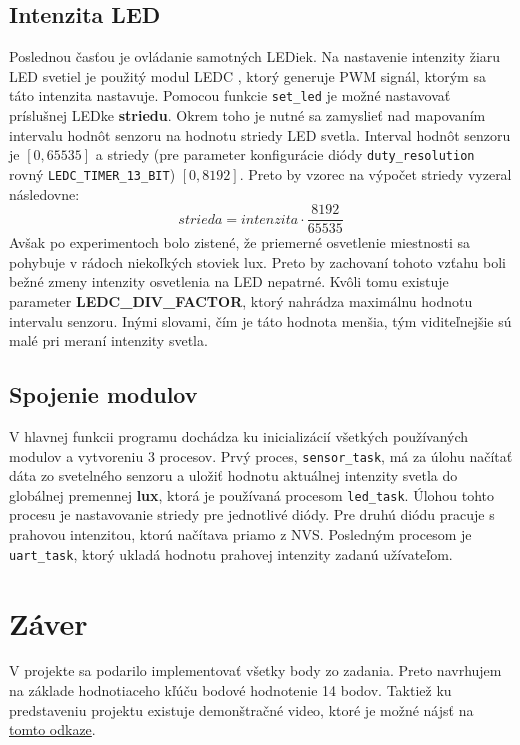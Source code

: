 \documentclass[a4paper]{article}
\begin{document}
\subsection{Intenzita LED}
Poslednou časťou je ovládanie samotných LEDiek. Na nastavenie intenzity žiaru LED svetiel je použitý modul LEDC \cite{LEDCdoc}, ktorý generuje PWM signál, ktorým sa táto intenzita nastavuje.
Pomocou funkcie \texttt{set\_led} je možné nastavovať príslušnej LEDke \textbf{striedu}. Okrem toho je nutné sa zamyslieť nad mapovaním intervalu hodnôt senzoru na hodnotu striedy LED svetla.
Interval hodnôt senzoru je $[0, 65535]$ a striedy (pre parameter konfigurácie diódy \texttt{duty\_resolution} rovný \texttt{LEDC\_TIMER\_13\_BIT}) $[0, 8192]$. Preto by vzorec na výpočet striedy vyzeral následovne:
\[strieda = intenzita \cdot \frac{8192}{65535}\]
Avšak po experimentoch bolo zistené, že priemerné osvetlenie miestnosti sa pohybuje v rádoch niekoľkých stoviek lux. Preto by zachovaní tohoto vzťahu boli bežné zmeny intenzity osvetlenia na LED nepatrné.
Kvôli tomu existuje parameter \textbf{LEDC\_DIV\_FACTOR}, ktorý nahrádza maximálnu hodnotu intervalu senzoru. Inými slovami, čím je táto hodnota menšia, tým viditeľnejšie sú malé pri meraní intenzity svetla.

\subsection{Spojenie modulov}
V hlavnej funkcii programu dochádza ku inicializácií všetkých používaných modulov a vytvoreniu 3 procesov. Prvý proces, \texttt{sensor\_task}, má za úlohu načítať dáta zo svetelného senzoru a uložiť hodnotu
aktuálnej intenzity svetla do globálnej premennej \textbf{lux}, ktorá je používaná procesom \texttt{led\_task}. Úlohou tohto procesu je nastavovanie striedy pre jednotlivé diódy. Pre druhú diódu pracuje
s prahovou intenzitou, ktorú načítava priamo z NVS. Posledným procesom je \texttt{uart\_task}, ktorý ukladá hodnotu prahovej intenzity zadanú užívateľom.

\section{Záver}
V projekte sa podarilo implementovať všetky body zo zadania. Preto navrhujem na základe hodnotiaceho kľúču bodové hodnotenie 14 bodov. Taktiež ku predstaveniu projektu existuje demonštračné video, ktoré je
možné nájsť na \href{https://drive.google.com/file/d/1lXDr_E6ccAvX4yyE-NwqP87h2Rnmdj_e/view?usp=share_link}{tomto odkaze}. 

\newpage

\renewcommand{\refname}{Literatúra}

\end{document}
